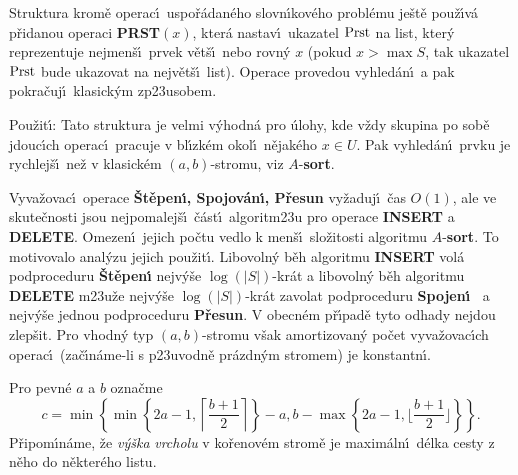 \flushpar Struktura krom\v e operac\'\i\ uspo\v r\'adan\'eho 
slovn\'\i kov\'eho prob\-l\'e\-mu 
je\v st\v e pou\v z\'\i v\'a p\v ridanou ope\-raci {\bf PRST$\left(x\right)$}, kter\'a nastav\'\i\ ukazatel 
$\operatorname{Prst}$ na list, kter\'y reprezentuje nejmen\v s\'\i\ prvek v\v et\v s\'\i\ 
nebo rovn\'y $x$ (pokud $x>\max S$, tak ukazatel $\operatorname{Prst}$ bude 
ukazovat na nejv\v et\v s\'\i\ list). Operace provedou vyhled\'an\'\i\ a 
pak pokra\v cuj\'\i\ klasick\'ym zp\accent23usobem.
\medskip

\flushpar Pou\v zit\'\i : Tato struktura je velmi v\'yhodn\'a pro 
\'ulohy, kde v\v zdy skupina po sob\v e jdouc\'\i ch ope\-rac\'\i\  
pracuje v bl\'\i zk\'em okol\'\i\ n\v eja\-k\'e\-ho $x\in U$. Pak 
vyhled\'an\'\i\ prvku je rychlej\v s\'\i\ ne\v z v klasick\'em 
$\left(a,b\right)$-stromu, viz $A$-{\bf sort}.
\medskip

\flushpar Vyva\v zovac\'\i\ operace {\bf \v St\v epen\'\i , Spojov\'an\'\i , P\v resun }
vy\v zaduj\'\i\ \v cas $O\left(1\right)$, ale ve skute\v cnosti jsou nejpomalej\v s\'\i\ 
\v c\'ast\'\i\ 
algoritm\accent23u pro operace {\bf INSERT} a {\bf DELETE}.  Omezen\'\i\ 
jejich po\v ctu vedlo k men\v s\'\i\ slo\v zitosti algoritmu $A$-{\bf sort}.  To motivovalo anal\'yzu 
jejich pou\v zit\'\i .\newline 
Libovoln\'y b\v eh algoritmu {\bf INSERT }
vol\'a podproceduru {\bf \v St\v epe\-n\'\i} nejv\'y\v se $\log\left(|
S|\right)$-kr\'at a libovoln\'y b\v eh 
algoritmu  {\bf DELETE} m\accent23u\-\v ze nejv\'y\v se $\log\left(|S|
\right)$-kr\'at zavolat podproceduru 
{\bf Spojen\'\i\ }
a nejv\'y\v se jednou podproceduru {\bf P\v resun}.  V obecn\'em 
p\v r\'\i pad\v e tyto od\-ha\-dy nejdou zlep\v sit.  Pro vhodn\'y typ 
$\left(a,b\right)$-stromu v\v sak amortizovan\'y po\v cet vyva\v zovac\'\i ch 
ope\-rac\'\i\ (za\v c\'\i n\'ame-li s  
p\accent23u\-vod\-n\v e pr\'az\-dn\'ym stromem) je konstantn\'\i .
\medskip

\flushpar Pro pevn\'e $a$ a $b$ ozna\v cme 
$$c=\min\left\{\min\left\{2a-1,\left\lceil\frac {b+1}2\right\rceil \right\}-a,b-\max\left\{2a-1,\lfloor\frac {
b+1}2\rfloor \right\}\right\}.$$
P\v ripom\'\i n\'ame, \v ze \emph{v\'y\v ska} \emph{vrcholu} v ko\v renov\'em strom\v e je 
maxim\'aln\'\i\ d\'elka cesty z n\v eho do n\v ekter\'eho listu.
\medskip

